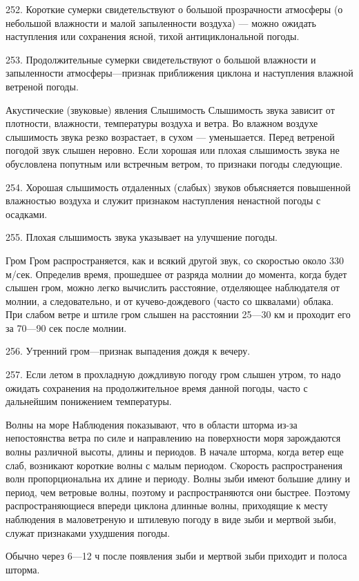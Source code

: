 252. Короткие сумерки свидетельствуют о большой прозрачности атмосферы (о небольшой влажности и малой запыленности воздуха) — можно ожидать наступления или сохранения ясной, тихой антициклональной погоды.

253. Продолжительные сумерки свидетельствуют о большой влажности и запыленности атмосферы—признак приближения циклона и наступления влажной ветреной погоды.

Акустические (звуковые) явления
Слышимость
Слышимость звука зависит от плотности, влажности, температуры воздуха и ветра. Во влажном воздухе слышимость звука резко возрастает, в сухом — уменьшается. Перед ветреной погодой звук слышен неровно. Если хорошая или плохая слышимость звука не обусловлена попутным или встречным ветром, то признаки погоды следующие.

254. Хорошая слышимость отдаленных (слабых) звуков объясняется повышенной влажностью воздуха и служит признаком наступления ненастной погоды с осадками.

255. Плохая слышимость звука указывает на улучшение погоды.

Гром
Гром распространяется, как и всякий другой звук, со скоростью около 330 м/сек. Определив время, прошедшее от разряда молнии до момента, когда будет слышен гром, можно легко вычислить расстояние, отделяющее наблюдателя от молнии, а следовательно, и от кучево-дождевого (часто со шквалами) облака. При слабом ветре и штиле гром слышен на расстоянии 25—30 км и проходит его за 70—90 сек после молнии.

256. Утренний гром—признак выпадения дождя к вечеру.

257. Если летом в прохладную дождливую погоду гром слышен утром, то надо ожидать сохранения на продолжительное время данной погоды, часто с дальнейшим понижением температуры.

Волны на море
Наблюдения показывают, что в области шторма из-за непостоянства ветра по силе и направлению на поверхности моря зарождаются волны различной высоты, длины и периодов. В начале шторма, когда ветер еще слаб, возникают короткие волны с малым периодом. Cкорость распространения волн пропорциональна их длине и периоду. Волны зыби имеют большие длину и период, чем ветровые волны, поэтому и распространяются они быстрее. Поэтому распространяющиеся впереди циклона длинные волны, приходящие к месту наблюдения в маловетреную и штилевую погоду в виде зыби и мертвой зыби, служат признаками ухудшения погоды.

Обычно через 6—12 ч после появления зыби и мертвой зыби приходит и полоса шторма.

